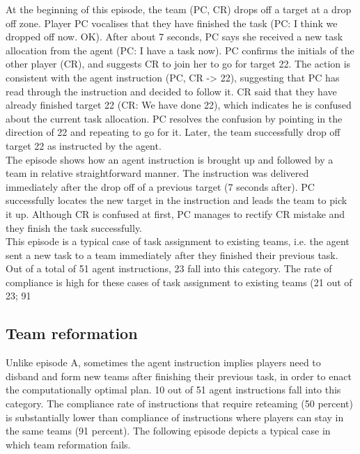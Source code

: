 At the beginning of this episode, the team (PC, CR) drops off a target at a drop off zone. Player PC vocalises that they have finished the task (PC: I think we dropped off now. OK).  After about 7 seconds, PC says she received a new task allocation from the agent (PC: I have a task now). PC confirms the initials of the other player (CR), and suggests CR to join her to go for target 22. The action is consistent with the agent instruction (PC, CR -> 22), suggesting that PC has read through the instruction and decided to follow it. CR said that they have already finished target 22 (CR: We have done 22), which indicates he is confused about the current task allocation. PC resolves the confusion by pointing in the direction of 22 and repeating to go for it. Later, the team successfully drop off target 22 as instructed by the agent.\\

The episode shows how an agent instruction is brought up and followed by a team in relative straightforward manner. The instruction was delivered immediately after the drop off of a previous target (7 seconds after). PC successfully locates the new target in the instruction and leads the team to pick it up. Although CR is confused at first, PC manages to rectify CR mistake and they finish the task successfully. \\

This episode is a typical case of task assignment to existing teams, i.e. the agent sent a new task to a team immediately after they finished their previous task. Out of a total of 51 agent instructions, 23 fall into this category. The rate of compliance is high for these cases of task assignment to existing teams (21 out of 23; 91%

\subsection{Team reformation}
Unlike episode A, sometimes the agent instruction implies players need to disband and form new teams after finishing their previous task, in order to enact the computationally optimal plan. 10 out of 51 agent instructions fall into this category. The compliance rate of instructions that require reteaming (50 percent) is substantially lower than compliance of instructions where players can stay in the same teams (91 percent). The following episode depicts a typical case in which team reformation fails.\\


